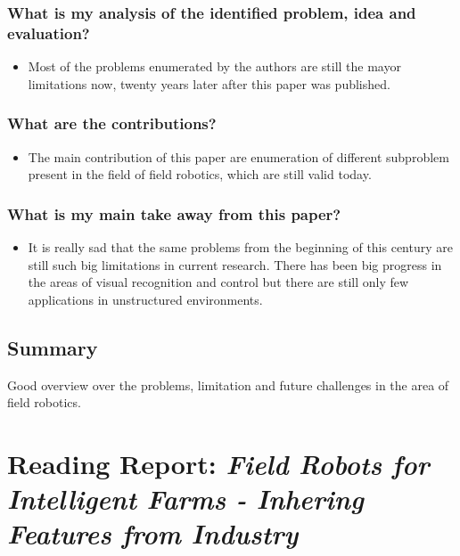     \subsubsection*{What is my analysis of the identified problem, idea and evaluation?}
    \begin{itemize}
        \item Most of the problems enumerated by the authors are still the mayor limitations now, twenty years later after this paper was published. 
    \end{itemize}
    \subsubsection*{What are the contributions?}
    \begin{itemize}
        \item The main contribution of this paper are enumeration of different subproblem present in the field of field robotics, which are still valid today.
    \end{itemize}
    \subsubsection*{What is my main take away from this paper?}
    \begin{itemize}
        \item It is really sad that the same problems from the beginning of this century are still such big limitations in current research. There has been big progress in the areas of visual recognition and control but there are still only few applications in unstructured environments.
    \end{itemize}
    
    \subsection*{Summary}
    Good overview over the problems, limitation and future challenges in the area of field robotics.


    \newpage
    
    \section{Reading Report: \emph{Field Robots for Intelligent Farms - Inhering Features from Industry}}
    \label{sec:deSantos2020}
    \cite{deSantos2020}
    
